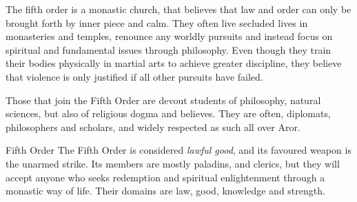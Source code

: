 The fifth order is a monastic church, that believes that law and order can only
be brought forth by inner piece and calm. They often live secluded lives in
monasteries and temples, renounce any worldly pursuits and instead focus on
spiritual and fundamental issues through philosophy. Even though they train
their bodies physically in martial arts to achieve greater discipline, they
believe that violence is only justified if all other pursuits have failed.

Those that join the Fifth Order are devout students of philosophy, natural
sciences, but also of religious dogma and believes. They are often, diplomats,
philosophers and scholars, and widely respected as such all over Aror.

\begin{35e}{Fifth Order}
  The Fifth Order is considered \emph{lawful good}, and its favoured weapon is
  the unarmed strike. Its members are mostly paladins, and clerics, but they
  will accept anyone who seeks redemption and spiritual enlightenment through a
  monastic way of life. Their domains are law, good, knowledge and strength.
\end{35e}

